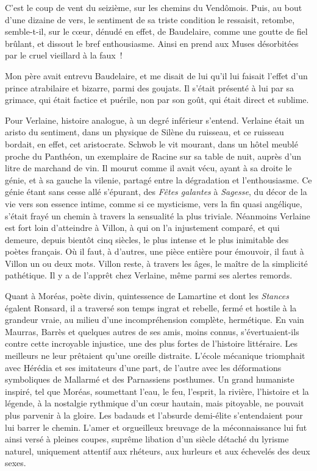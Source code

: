 \documentclass[french,twoside]{book} %
\begin{document}
\noindent C’est le coup de vent du seizième, sur les chemins du Vendômois. Puis, au bout d’une dizaine de vers, le sentiment de sa triste condition le ressaisit, retombe, semble-t-il, sur le cœur, dénudé en effet, de Baudelaire, comme une goutte de fiel brûlant, et dissout le bref enthousiasme. Ainsi en prend aux Muses désorbitées par le cruel vieillard à la faux !\par
Mon père avait entrevu Baudelaire, et me disait de lui qu’il lui faisait l’effet d’un prince atrabilaire et bizarre, parmi des goujats. Il s’était présenté à lui par sa grimace, qui était factice et puérile, non par son goût, qui était direct et sublime.\par
Pour Verlaine, histoire analogue, à un degré inférieur s’entend. Verlaine était un aristo du sentiment, dans un physique de Silène du ruisseau, et ce ruisseau bordait, en effet, cet aristocrate. Schwob le vit mourant, dans un hôtel meublé proche du Panthéon, un exemplaire de Racine sur sa table de nuit, auprès d’un litre de marchand de vin. Il mourut comme il avait vécu, ayant à sa droite le génie, et à sa gauche la vilenie, partagé entre la dégradation et l’enthousiasme. Ce génie étant sans cesse allé s’épurant, des {\itshape Fêtes galantes} à {\itshape Sagesse}, du décor de la vie vers son essence intime, comme si ce mysticisme, vers la fin quasi angélique, s’était frayé un chemin à travers la sensualité la plus triviale. Néanmoins Verlaine est fort loin d’atteindre à Villon, à qui on l’a injustement comparé, et qui demeure, depuis bientôt cinq siècles, le plus intense et le plus inimitable des poètes français. Où il faut, à d’autres, une pièce entière pour émouvoir, il faut à Villon un ou deux mots. Villon reste, à travers les âges, le maître de la simplicité pathétique. Il y a de l’apprêt chez Verlaine, même parmi ses alertes remords.\par
Quant à Moréas, poète divin, quintessence de Lamartine et dont les {\itshape Stances} égalent Ronsard, il a traversé son temps ingrat et rebelle, fermé et hostile à la grandeur vraie, au milieu d’une incompréhension complète, hermétique. En vain Maurras, Barrès et quelques autres de ses amis, moins connus, s’évertuaient-ils contre cette incroyable injustice, une des plus fortes de l’histoire littéraire. Les meilleurs ne leur prêtaient qu’une oreille distraite. L’école mécanique triomphait avec Hérédia et ses imitateurs d’une part, de l’autre avec les déformations symboliques de Mallarmé et des Parnassiens posthumes. Un grand humaniste inspiré, tel que Moréas, soumettant l’eau, le feu, l’esprit, la rivière, l’histoire et la légende, à la nostalgie rythmique d’un cœur hautain, mais pitoyable, ne pouvait plus parvenir à la gloire. Les badauds et l’absurde demi-élite s’entendaient pour lui barrer le chemin. L’amer et orgueilleux breuvage de la méconnaissance lui fut ainsi versé à pleines coupes, suprême libation d’un siècle détaché du lyrisme naturel, uniquement attentif aux rhéteurs, aux hurleurs et aux échevelés des deux sexes.\par
\end{document}
